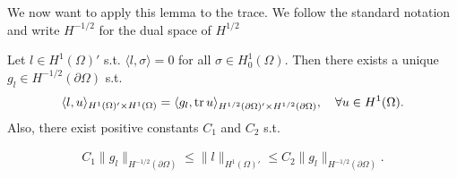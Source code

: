 \documentclass[../master_thesis.tex]{subfiles}
\begin{document}
We now want to apply this lemma to the trace. 
We follow the standard notation and write $H^{-1/2}$ for the dual space of 
$H^{1/2}$
\begin{proposition}\label{prop:existence_gl_in_H12}
    Let $l \in H^1(\Omega)'$ s.t. $\langle l, \sigma \rangle = 0$
    for all $\sigma \in H^1_0(\Omega)$. Then there exists a unique
    $g_l \in H^{-1/2}(\partial \Omega)$ s.t.
    \begin{align}
        \langle l, u \rangle_{H^1(\Omega)' \times H^1(\Omega)} 
        = \langle g_l, \operatorname{tr} u \rangle_{H^{1/2}(\partial \Omega)' \times H^{1/2}(\partial \Omega)}, 
            \quad \forall u \in H^1(\Omega). \label{eq:functional_as_trace_inner_product}
    \end{align}
    Also, there exist positive constants $C_1$ and $C_2$ s.t.
    
    \begin{align*}
        C_1 \lVert g_l \rVert _{H^{-1/2}(\partial \Omega)} \leq  \lVert l \rVert _{H^1(\Omega)'}
        \leq C_2 \lVert g_l \rVert _{H^{-1/2}(\partial \Omega)}.            
    \end{align*}
\end{proposition}
\end{document}
